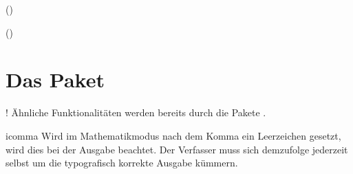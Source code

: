 \documentclass[english,ngerman,ToDo=no]{tudscrman3}
\begin{document}
\Blindtext

() 

() 

\section{Das Paket }
\begin{Declaration*}{}!
Ähnliche Funktionalitäten werden bereits durch die Pakete .
\end{Declaration*}

\begin{packages}
  \item[icomma]
    Wird im Mathematikmodus nach dem Komma ein Leerzeichen gesetzt, wird dies 
    bei der Ausgabe beachtet. Der Verfasser muss sich demzufolge jederzeit 
    selbst um die typografisch korrekte Ausgabe kümmern.
\end{packages}

\clearpage
\makeatletter
\@printindex[options]
\@printindex[files]
\end{document}
